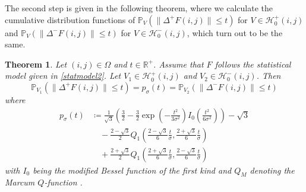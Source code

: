 \documentclass[a4paper,12pt]{article}
\newcommand{\norm}[1]{\lVert#1\rVert}
\theoremstyle{plain}
\newtheorem{theorem}{Theorem}[section]
\theoremstyle{definition}
\begin{document}
The second step is given in the following theorem, where we calculate the cumulative distribution functions of $\mathbb{P}_V( \norm{\Delta^+ F(i, j)} \leq t )$ for $V \in \mathcal{H}_0^+(i, j)$ and $\mathbb{P}_V( \norm{\Delta^- F(i, j)} \leq t )$ for $V \in \mathcal{H}_0^-(i, j)$, which turn out to be the same.

\begin{theorem}\label{thm: cdf}
	Let $(i, j) \in \Omega$ and $t \in \mathbb{R}^+$. Assume that $F$ follows the statistical model given in \eqref{statmodel2}. Let $V_1 \in \mathcal{H}_0^+(i, j)$ and $V_2 \in \mathcal{H}_0^-(i, j)$. Then
	\begin{equation}\label{eq: probequality}
		\mathbb{P}_{V_1}( \norm{\Delta^+ F(i, j)} \leq t ) = p_\sigma(t) = \mathbb{P}_{V_2}( \norm{\Delta^- F(i, j)} \leq t )
	\end{equation}
	where
	\begin{equation}\label{eq: cdf}
		\begin{aligned}
			p_\sigma(t) &\coloneqq \frac{1}{\sqrt{3}} \left( \frac{3}{2} - \frac{3}{2} \exp \left( - \frac{t^2}{3 \sigma^2} \right) I_0 \left( \frac{t^2}{6 \sigma^2} \right) \right) - \sqrt{3} \\
			&\quad - \frac{2 - \sqrt{3}}{2} Q_1 \left( \frac{2 - \sqrt{3}}{6} \frac{t}{\sigma}, \frac{2 + \sqrt{3}}{6} \frac{t}{\sigma} \right) \\
			&\quad + \frac{2 + \sqrt{3}}{2} Q_1 \left( \frac{2 + \sqrt{3}}{6} \frac{t}{\sigma}, \frac{2 - \sqrt{3}}{6} \frac{t}{\sigma} \right)
		\end{aligned}
	\end{equation}
	with $I_0$ being the modified Bessel function of the first kind \cite[p.~910-911]{TISP} and $Q_M$ denoting the Marcum $Q$-function \cite{IntQFunction}.
\end{theorem}
\end{document}
